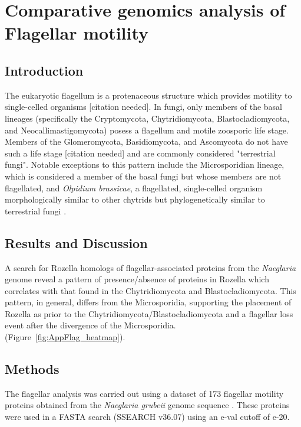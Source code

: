 \chapter{Comparative genomics analysis of Flagellar motility}
\label{app:Flagella}
\section{Introduction}
The eukaryotic flagellum is a protenaceous structure which provides motility to single-celled organisms [citation needed]. In fungi, only members of the basal lineages (specifically the Cryptomycota, Chytridiomycota, Blastocladiomycota, and Neocallimastigomycota) posess a flagellum and motile zoosporic life stage. Members of the Glomeromycota, Basidiomycota, and Ascomycota do not have such a life stage [citation needed] and are commonly considered "terrestrial fungi". Notable exceptions to this pattern include the Microsporidian lineage, which is considered a member of the basal fungi but whose members are not flagellated, and \textit{Olpidium brassicae}, a flagellated, single-celled organism morphologically similar to other chytrids but phylogenetically similar to terrestrial fungi \cite{Sekimoto2011}. \\
\section{Results and Discussion}
A search for Rozella homologs of flagellar-associated proteins from the \textit{Naeglaria} genome \cite{FritzLaylin2011} reveal a pattern of presence/absence of proteins in Rozella which correlates with that found in the Chytridiomycota and Blastocladiomycota. This pattern, in general, differs from the Microsporidia, supporting the placement of Rozella as prior to the Chytridiomycota/Blastocladiomycota and a flagellar loss event after the divergence of the Microsporidia. \\
\indent (Figure~\ref{fig:AppFlag_heatmap}).\\
\section{Methods}
The flagellar analysis was carried out using a dataset of 173 flagellar motility proteins obtained from the \textit{Naeglaria grubeii} genome sequence \cite{FritzLaylin2011}. These proteins were used in a FASTA search (SSEARCH v36.07) using an e-val cutoff of e-20.\\
